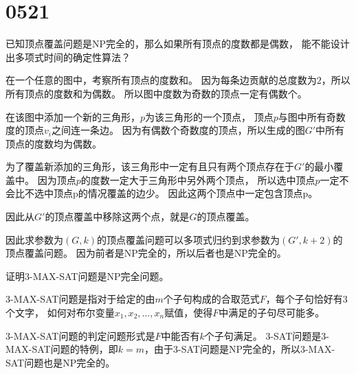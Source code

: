 \section{0521}\label{sec:0521}
\begin{questions}
    \question 已知顶点覆盖问题是NP完全的，那么如果所有顶点的度数都是偶数，
    能不能设计出多项式时间的确定性算法？

    \begin{solution}
        在一个任意的图中，考察所有顶点的度数和。
        因为每条边贡献的总度数为$2$，所以所有顶点的度数和为偶数。
        所以图中度数为奇数的顶点一定有偶数个。

        在该图中添加一个新的三角形，$p$为该三角形的一个顶点，
        顶点$p$与图中所有奇数度的顶点$v_i$之间连一条边。
        因为有偶数个奇数度的顶点，所以生成的图$G'$中所有顶点的度数均为偶数。

        为了覆盖新添加的三角形，该三角形中一定有且只有两个顶点存在于$G'$的最小覆盖中。
        因为顶点$p$的度数一定大于三角形中另外两个顶点，
        所以选中顶点$p$一定不会比不选中顶点p的情况覆盖的边少。
        因此这两个顶点中一定包含顶点p。

        因此从$G'$的顶点覆盖中移除这两个点，就是$G$的顶点覆盖。

        因此求参数为$(G,k)$的顶点覆盖问题可以多项式归约到求参数为$(G',k+2)$的顶点覆盖问题。
        因为前者是NP完全的，所以后者也是NP完全的。

    \end{solution}


    \question 证明3-MAX-SAT问题是NP完全问题。

    3-MAX-SAT问题是指对于给定的由$m$个子句构成的合取范式$F$，每个子句恰好有$3$个文字，
    如何对布尔变量$x_1,x_2, \dots ,x_n$赋值，使得$F$中满足的子句尽可能多。

    \begin{solution}

        3-MAX-SAT问题的判定问题形式是$F$中能否有$k$个子句满足。
        3-SAT问题是3-MAX-SAT问题的特例，即$k=m$，由于3-SAT问题是NP完全的，所以3-MAX-SAT问题也是NP完全的。




    \end{solution}

\end{questions}
